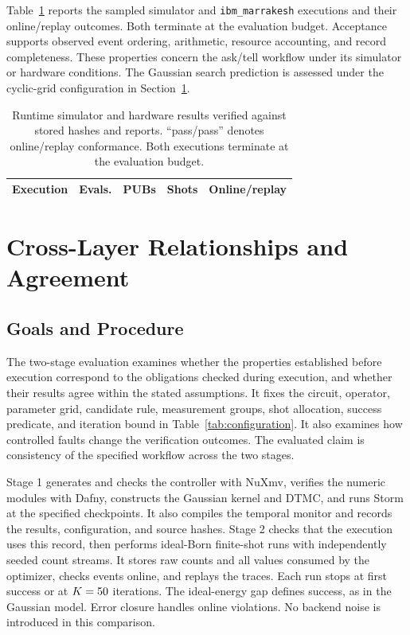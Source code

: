 \documentclass[conference]{IEEEtran}
\begin{document}
Table~\ref{tab:hardware} reports the sampled simulator and \texttt{ibm\_marrakesh} executions and their online/replay outcomes. Both terminate at the evaluation budget. Acceptance supports observed event ordering, arithmetic, resource accounting, and record completeness. These properties concern the ask/tell workflow under its simulator or hardware conditions. The Gaussian search prediction is assessed under the cyclic-grid configuration in Section~\ref{sec:crosslayer}.

\begin{table}[!t]
\centering\footnotesize
\caption{Runtime simulator and hardware results verified against stored hashes and reports. ``pass/pass'' denotes online/replay conformance. Both executions terminate at the evaluation budget.}
\label{tab:hardware}
\begin{tabular}{@{}lrrrl@{}}\toprule
Execution & Evals. & PUBs & Shots & Online/replay \\
\midrule


\end{tabular}
\end{table}

\section{Cross-Layer Relationships and Agreement}
\label{sec:crosslayer}
\subsection{Goals and Procedure}
The two-stage evaluation examines whether the properties established before execution correspond to the obligations checked during execution, and whether their results agree within the stated assumptions. It fixes the circuit, operator, parameter grid, candidate rule, measurement groups, shot allocation, success predicate, and iteration bound in Table~\ref{tab:configuration}. It also examines how controlled faults change the verification outcomes. The evaluated claim is consistency of the specified workflow across the two stages.

Stage 1 generates and checks the controller with NuXmv, verifies the numeric modules with Dafny, constructs the Gaussian kernel and DTMC, and runs Storm at the specified checkpoints. It also compiles the temporal monitor and records the results, configuration, and source hashes. Stage 2 checks that the execution uses this record, then performs \BaselineRuns ideal-Born finite-shot runs with independently seeded count streams. It stores raw counts and all values consumed by the optimizer, checks events online, and replays the traces. Each run stops at first success or at $K=50$ iterations. The ideal-energy gap defines success, as in the Gaussian model. Error closure handles online violations. No backend noise is introduced in this comparison.
\end{document}
